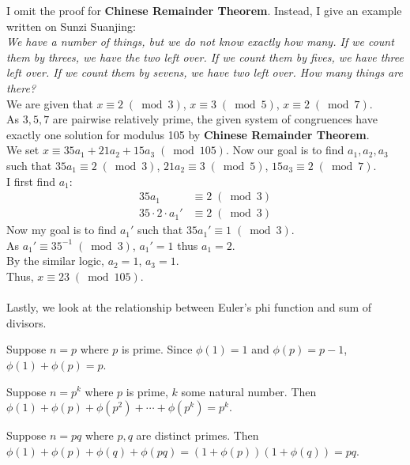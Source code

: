 I omit the proof for \textbf{Chinese Remainder Theorem}. Instead, I give an example written on Sunzi Suanjing: \\
\textit{We have a number of things, but we do not know exactly how many. If we count them by threes, we have the two left over. If we count them by fives, we have three left over. If we count them by sevens, we have two left over. How many things are there?} \\
We are given that $x\equiv 2\; (\bmod{3})$, $x\equiv 3\; (\bmod{5})$, $x\equiv 2\; (\bmod{7})$. \\
As $3, 5, 7$ are pairwise relatively prime, the given system of congruences have exactly one solution for modulus 105 by \textbf{Chinese Remainder Theorem}. \\
We set $x\equiv 35a_{1} + 21a_{2} + 15a_{3}\; (\bmod{105})$. Now our goal is to find $a_{1},a_{2},a_{3}$ such that $35a_{1}\equiv 2\; (\bmod{3})$, $21a_{2}\equiv 3\; (\bmod{5})$, $15a_{3}\equiv 2\; (\bmod{7})$. \\
I first find $a_{1}$:
\begin{align*}
  35a_{1} &\equiv 2\; (\bmod{3}) \\
  35\cdot 2\cdot a_{1}' &\equiv 2\; (\bmod{3})
\end{align*}
Now my goal is to find $a_{1}'$ such that $35a_{1}'\equiv 1\; (\bmod{3})$. \\
As $a_{1}'\equiv 35^{-1}\; (\bmod{3})$, $a_{1}' =  1$ thus $a_{1} = 2$. \\
By the similar logic, $a_{2} = 1$, $a_{3} = 1$. \\
Thus, $x\equiv 23\; (\bmod{105})$. \\
\\
\noindent
Lastly, we look at the relationship between Euler's phi function and sum of divisors.

\begin{observation}
  Suppose $n = p$ where $p$ is prime. Since $\phi(1) = 1$ and $\phi(p) = p - 1$, $\phi(1) + \phi(p) = p$.
\end{observation}

\begin{observation}
  Suppose $n = p^{k}$ where $p$ is prime, $k$ some natural number. Then $\phi(1) + \phi(p) + \phi(p^{2}) + \cdots + \phi(p^{k}) = p^{k}$. 
\end{observation}

\begin{observation}
  Suppose $n = pq$ where $p,q$ are distinct primes. Then $\phi(1) + \phi(p) + \phi(q) + \phi(pq) = (1 + \phi(p))(1 + \phi(q)) = pq$.
\end{observation}

